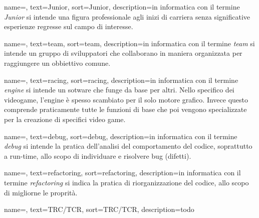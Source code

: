 
\renewcommand{\acronymname}{Acronimi e abbreviazioni}





{
	name=,
	text=Junior,
	sort=Junior,
	description={in informatica con il termine \emph{Junior} si intende una figura professionale agli inizi di carriera senza significative esperienze regresse sul campo di interesse.}
}

{
	name=,
	text=team,
	sort=team,
	description={in informatica con il termine \emph{team} si intende un gruppo di sviluppatori che collaborano in maniera organizzata per raggiungere un obbiettivo comune.}
}

{
	name=,
	text=racing,
	sort=racing,
	description={in informatica con il termine \emph{engine} si intende un sotware che funge da base per altri. Nello specifico dei videogame, l'engine è spesso scambiato per il solo motore grafico. Invece questo comprende praticamente tutte le funzioni di base che poi vengono specializzate per la creazione di specifici video game.}
}

{
	name=,
	text=debug,
	sort=debug,
	description={in informatica con il termine \emph{debug} si intende la pratica dell'analisi del comportamento del codice, soprattutto a run-time, allo scopo di individuare e risolvere bug (difetti).}
}

{
	name=,
	text=refactoring,
	sort=refactoring,
	description={in informatica con il termine \emph{refactoring} si indica la pratica di riorganizzazione del codice, allo scopo di migliorne le proprità.}
}

{
	name=,
	text=TRC/TCR,
	sort=TRC/TCR,
	description={todo}
}

